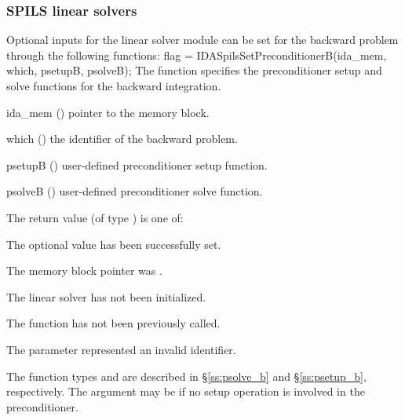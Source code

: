 \subsubsection{SPILS linear solvers}
Optional inputs for the {\idaspils} linear solver module can be set for the backward
problem through the following functions:
{
  flag = IDASpilsSetPreconditionerB(ida\_mem, which, psetupB, psolveB);
}
{
  The function  specifies the preconditioner
  setup and solve functions for the backward integration.
}
{
  \begin{args}[psetupB]
  \item[ida\_mem] ()
    pointer to the {\idas} memory block.
  \item[which] ()
    the identifier of the backward problem.
  \item[psetupB] ()
    user-defined preconditioner setup function.
  \item[psolveB] ()
    user-defined preconditioner solve function.
  \end{args}
}
{
  The return value  (of type ) is one of:
  \begin{args}
  \item[\Id{IDASPILS\_SUCCESS}] 
    The optional value has been successfully set.
  \item[\Id{IDASPILS\_MEM\_NULL}]
    The  memory block pointer was .
  \item[\Id{IDASPILS\_LMEM\_NULL}]
    The {\idaspils} linear solver has not been initialized.
  \item[\Id{IDASPILS\_NO\_ADJ}]
    The function  has not been previously called.
  \item[\Id{IDASPILS\_ILL\_INPUT}]
    The parameter  represented an invalid identifier.
  \end{args}
}
{
   The function types  and  are
   described in \S\ref{ss:psolve_b} and \S\ref{ss:psetup_b}, respectively.
   The  argument may be  if no setup operation is involved
   in the preconditioner.
}
